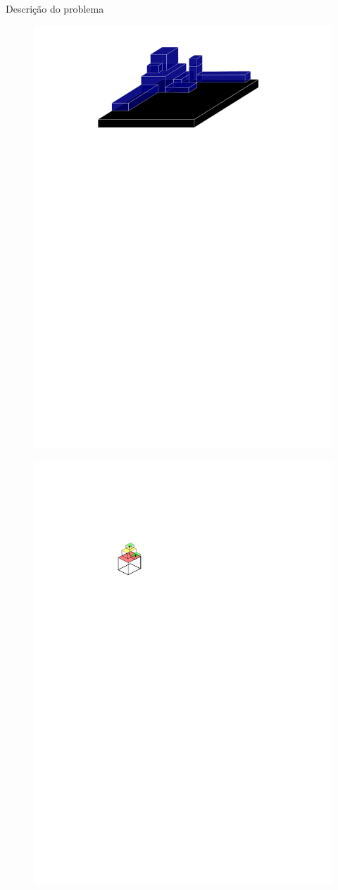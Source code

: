 \documentclass[12pt]{beamer}
\begin{document}
\begin{frame}{Descri\c{c}\~ao do problema}
{\begin{minipage}[t]{0.48\linewidth}
	\end{minipage}}%
	\hfill%
	{%
		\begin{minipage}[t]{0.48\linewidth}
			\begin{figure}			
				\includegraphics[width=1\linewidth]{volume_caixas}
			\end{figure}
			\begin{figure}			
				\includegraphics[width=0.45\linewidth]{pressao_caixas}
				
			\end{figure}
		\end{minipage}
	}
\end{frame}
\end{document}
